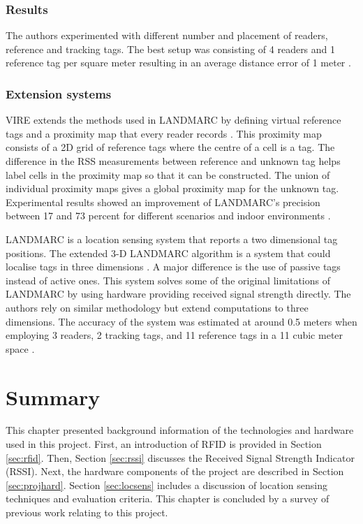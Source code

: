 \subsubsection{Results}

The authors experimented with different number and placement of readers, reference and tracking tags. The best setup was consisting of 4 readers and 1 reference tag per square meter resulting in an average distance error of 1 meter \cite{Ni2004}.

\subsubsection{Extension systems}

VIRE extends the methods used in LANDMARC by defining virtual reference tags and a proximity map that every reader records \cite{Zhao2007}. This proximity map consists of a 2D grid of reference tags where the centre of a cell is a tag. The difference in the RSS measurements between reference and unknown tag helps label cells in the proximity map so that it can be constructed. The union of individual proximity maps gives a global proximity map for the unknown tag. Experimental results showed an improvement of LANDMARC's precision between 17 and 73 percent for different scenarios and indoor environments \cite{Zhao2007}.

LANDMARC is a location sensing system that reports a two dimensional tag positions. The extended 3-D LANDMARC algorithm is a system that could localise tags in three dimensions \cite{Khan2009}. A major difference is the use of passive tags instead of active ones. This system solves some of the original limitations of LANDMARC by using hardware providing received signal strength directly. The authors rely on similar methodology but extend computations to three dimensions. The accuracy of the system was estimated at around 0.5 meters when employing 3 readers, 2 tracking tags, and 11 reference tags in a 11 cubic meter space \cite{Khan2009}.


\section{Summary}

This chapter presented background information of the technologies and hardware used in this project. First, an introduction of RFID is provided in Section \ref{sec:rfid}.  Then, Section \ref{sec:rssi} discusses the Received Signal Strength Indicator (RSSI). Next, the hardware components of the project are described in Section \ref{sec:projhard}. Section \ref{sec:locsens} includes a discussion of location sensing techniques and evaluation criteria. This chapter is concluded by a survey of previous work relating to this project.
